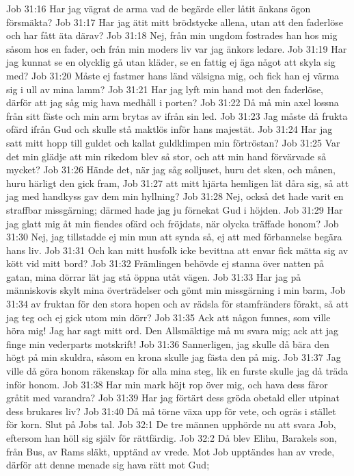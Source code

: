Job 31:16  Har jag vägrat de arma vad de begärde eller låtit änkans ögon försmäkta?
Job 31:17  Har jag ätit mitt brödstycke allena, utan att den faderlöse och har fått äta därav?
Job 31:18  Nej, från min ungdom fostrades han hos mig såsom hos en fader, och från min moders liv var jag änkors ledare.
Job 31:19  Har jag kunnat se en olycklig gå utan kläder, se en fattig ej äga något att skyla sig med?
Job 31:20  Måste ej fastmer hans länd välsigna mig, och fick han ej värma sig i ull av mina lamm?
Job 31:21  Har jag lyft min hand mot den faderlöse, därför att jag såg mig hava medhåll i porten?
Job 31:22  Då må min axel lossna från sitt fäste och min arm brytas av ifrån sin led.
Job 31:23  Jag måste då frukta ofärd ifrån Gud och skulle stå maktlös inför hans majestät.
Job 31:24  Har jag satt mitt hopp till guldet och kallat guldklimpen min förtröstan?
Job 31:25  Var det min glädje att min rikedom blev så stor, och att min hand förvärvade så mycket?
Job 31:26  Hände det, när jag såg solljuset, huru det sken, och månen, huru härligt den gick fram,
Job 31:27  att mitt hjärta hemligen lät dåra sig, så att jag med handkyss gav dem min hyllning?
Job 31:28  Nej, också det hade varit en straffbar missgärning; därmed hade jag ju förnekat Gud i höjden.
Job 31:29  Har jag glatt mig åt min fiendes ofärd och fröjdats, när olycka träffade honom?
Job 31:30  Nej, jag tillstadde ej min mun att synda så, ej att med förbannelse begära hans liv.
Job 31:31  Och kan mitt husfolk icke bevittna att envar fick mätta sig av kött vid mitt bord?
Job 31:32  Främlingen behövde ej stanna över natten på gatan, mina dörrar lät jag stå öppna utåt vägen.
Job 31:33  Har jag på människovis skylt mina överträdelser och gömt min missgärning i min barm,
Job 31:34  av fruktan för den stora hopen och av rädsla för stamfränders förakt, så att jag teg och ej gick utom min dörr?
Job 31:35  Ack att någon funnes, som ville höra mig! Jag har sagt mitt ord. Den Allsmäktige må nu svara mig; ack att jag finge min vederparts motskrift!
Job 31:36  Sannerligen, jag skulle då bära den högt på min skuldra, såsom en krona skulle jag fästa den på mig.
Job 31:37  Jag ville då göra honom räkenskap för alla mina steg, lik en furste skulle jag då träda inför honom.
Job 31:38  Har min mark höjt rop över mig, och hava dess fåror gråtit med varandra?
Job 31:39  Har jag förtärt dess gröda obetald eller utpinat dess brukares liv?
Job 31:40  Då må törne växa upp för vete, och ogräs i stället för korn. Slut på Jobs tal.
Job 32:1  De tre männen upphörde nu att svara Job, eftersom han höll sig själv för rättfärdig.
Job 32:2  Då blev Elihu, Barakels son, från Bus, av Rams släkt, upptänd av vrede. Mot Job upptändes han av vrede, därför att denne menade sig hava rätt mot Gud;
